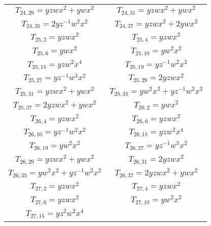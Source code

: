 \begin{longtable}{|c|c|}
$T_{24,29}= yzwx^2+ywx^2$ &

$T_{24,31}= yzwx^2+ywx^2$\\ 

$T_{24,35}= 2yz^{-1}w^2x^2$&

$T_{24,37}= yzwx^2+2ywx^2$ \\

$T_{25,2}= yzwx^2$&

$T_{25,4}= yzwx^2$\\

$T_{25,6}= ywx^2$&

$T_{25,10}= yw^2x^2$\\

$T_{25,15}= yzw^2x^4$&

$T_{25,19}= yz^{-1}w^2x^2$\\

$T_{25,27}= yz^{-1}w^3x^2$&

$T_{25,29}= 2yzwx^2$\\

$T_{25,31}= yzwx^2+ywx^2$ & 

$T_{25,35}= yw^2x^2+yz^{-1}w^2x^2$\\

$T_{25,37}= 2yzwx^2+ywx^2$& 

$T_{26,2}= ywx^2$ \\

$T_{26,4}= yzwx^2$&

$T_{26,6}= yzwx^2$ \\

$T_{26,10}= yz^{-1}w^2x^2$ &

$T_{26,15}= yzw^2x^4$\\ 

$T_{26,19}= yw^2x^2$ &

$T_{26,27}= yz^{-1}w^3x^2$ \\

$T_{26,29}= yzwx^2+ywx^2$&

$T_{26,31}= 2yzwx^2$\\

$T_{26,35}= yw^2x^2+yz^{-1}w^2x^2$&

$T_{26,37}= 2yzwx^2+ywx^2$\\

$T_{27,2}= yzwx^2$&

$T_{27,4}= yzwx^2$\\

$T_{27,6}= yzwx^2$&

$T_{27,10}= yw^2x^2$\\

$T_{27,15}= yz^2w^2x^4$&


\end{longtable}
